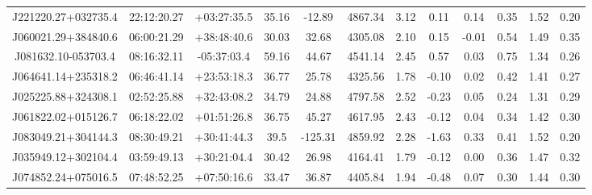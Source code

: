\documentclass[a4paper,fleqn,usenatbib]{mnras}
\begin{document}
\begin{table}
\begin{tabular}{@{}cccccccccccc@{}}
			J221220.27+032735.4 & 22:12:20.27 & +03:27:35.5  & 35.16               	& -12.89              	& 4867.34             	& 3.12           	& 0.11               	& 0.14                   	& 0.35                     	& 1.52             	& 0.20       	\\
			J060021.29+384840.6 & 06:00:21.29 & +38:48:40.6  & 30.03               	& 32.68               	& 4305.08             	& 2.10           	& 0.15               	& -0.01                  	& 0.54                     	& 1.49             	& 0.35       	\\
			J081632.10-053703.4 & 08:16:32.11 & -05:37:03.4  & 59.16               	& 44.67               	& 4541.14             	& 2.45           	& 0.57               	& 0.03                   	& 0.75                     	& 1.34             	& 0.26       	\\
			J064641.14+235318.2 & 06:46:41.14 & +23:53:18.3  & 36.77               	& 25.78               	& 4325.56             	& 1.78           	& -0.10              	& 0.02                   	& 0.42                     	& 1.41             	& 0.27       	\\
			J025225.88+324308.1 & 02:52:25.88 & +32:43:08.2  & 34.79               	& 24.88               	& 4797.58             	& 2.52           	& -0.23              	& 0.05                   	& 0.24                     	& 1.31             	& 0.29       	\\
			J061822.02+015126.7 & 06:18:22.02 & +01:51:26.8  & 36.75               	& 45.27               	& 4617.95             	& 2.43           	& -0.12              	& 0.04                   	& 0.34                     	& 1.42             	& 0.30       	\\
			J083049.21+304144.3 & 08:30:49.21 & +30:41:44.3  & 39.5                	& -125.31             	& 4859.92             	& 2.28           	& -1.63              	& 0.33                   	& 0.41                     	& 1.52             	& 0.20       	\\
			J035949.12+302104.4 & 03:59:49.13 & +30:21:04.4  & 30.42               	& 26.98               	& 4164.41             	& 1.79           	& -0.12              	& 0.00                   	& 0.36                     	& 1.47             	& 0.32       	\\
			J074852.24+075016.5 & 07:48:52.25 & +07:50:16.6  & 33.47               	& 36.87               	& 4405.84             	& 1.94           	& -0.48              	& 0.07                   	& 0.30                     	& 1.44             	& 0.30       	\\

\end{tabular}
\end{table}
\end{document}
